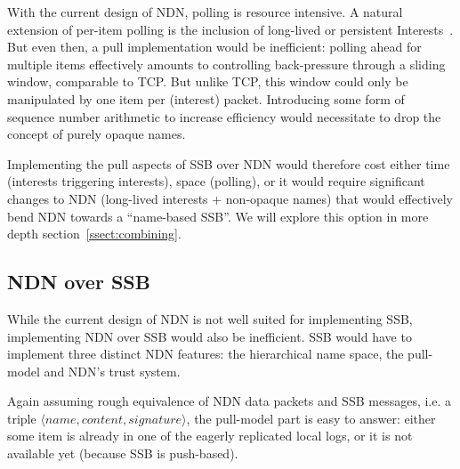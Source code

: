 \documentclass[9pt,sigconf]{acmart}
\begin{document}
With the current design of NDN, polling is resource intensive. A
natural extension of per-item polling is the inclusion of long-lived
or persistent Interests~\cite{moll2018persistent}. But even then, a
pull implementation would be inefficient: polling ahead for multiple
items effectively amounts to controlling back-pressure through a
sliding window, comparable to TCP. But unlike TCP, this window could
only be manipulated by one item per (interest) packet. Introducing
some form of sequence number arithmetic to increase efficiency would
necessitate to drop the concept of purely opaque names.

Implementing the pull aspects of SSB over NDN would therefore cost
either time (interests triggering interests), space (polling), or it
would require significant changes to NDN (long-lived interests +
non-opaque names) that would effectively bend NDN towards a
``name-based SSB''. We will explore this option in more depth
section~\ref{ssect:combining}.


\subsection{NDN over SSB}
\label{ssect:ndn-over-ssb}

While the current design of NDN is not well suited for implementing
SSB, implementing NDN over SSB would also be inefficient. SSB would
have to implement three distinct NDN features: the hierarchical name
space, the pull-model and NDN's trust system.

Again assuming rough equivalence of NDN data packets and SSB messages,
i.e. a triple $\langle name,content,signature\rangle$, the pull-model
part is easy to answer: either some item is already in one of the
eagerly replicated local logs, or it is not available yet (because SSB
is push-based).
\end{document}
